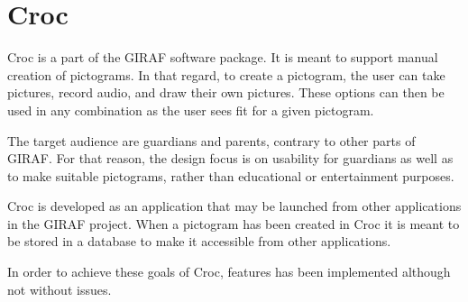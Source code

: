 \section{Croc}
Croc is a part of the GIRAF software package. 
It is meant to support manual creation of pictograms.
In that regard, to create a pictogram, the user can take pictures, record audio, and draw their own pictures.
These options can then be used in any combination as the user sees fit for a given pictogram.

The target audience are guardians and parents, contrary to other parts of GIRAF. 
For that reason, the design focus is on usability for guardians as well as to make suitable pictograms, rather than educational or entertainment purposes.

Croc is developed as an application that may be launched from other applications in the GIRAF project.
When a pictogram has been created in Croc it is meant to be stored in a database to make it accessible from other applications.

In order to achieve these goals of Croc, features has been implemented although not without issues.
